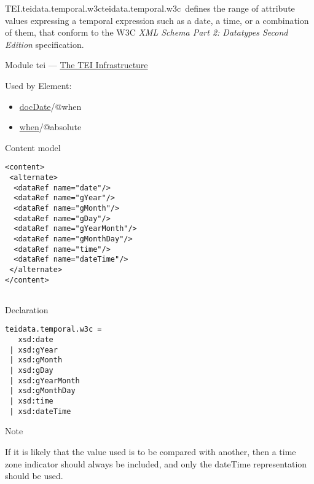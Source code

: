 \begin{reflist}
\item[]\begin{specHead}{TEI.teidata.temporal.w3c}{teidata.temporal.w3c} defines the range of attribute values expressing a temporal expression such as a date, a time, or a combination of them, that conform to the W3C \textit{XML Schema Part 2: Datatypes Second Edition} specification.\end{specHead} 
    \item[{Module}]
  tei — \hyperref[ST]{The TEI Infrastructure}
    \item[{Used by}]
  Element: \begin{itemize}
\item \hyperref[TEI.docDate]{docDate}/@when
\item \hyperref[TEI.when]{when}/@absolute
\end{itemize} 
    \item[{Content model}]
  \mbox{}\hfill\\[-10pt]\begin{Verbatim}[fontsize=\small]
<content>
 <alternate>
  <dataRef name="date"/>
  <dataRef name="gYear"/>
  <dataRef name="gMonth"/>
  <dataRef name="gDay"/>
  <dataRef name="gYearMonth"/>
  <dataRef name="gMonthDay"/>
  <dataRef name="time"/>
  <dataRef name="dateTime"/>
 </alternate>
</content>
    
\end{Verbatim}

    \item[{Declaration}]
  \mbox{}\hfill\\[-10pt]\begin{Verbatim}[fontsize=\small]
teidata.temporal.w3c =
   xsd:date
 | xsd:gYear
 | xsd:gMonth
 | xsd:gDay
 | xsd:gYearMonth
 | xsd:gMonthDay
 | xsd:time
 | xsd:dateTime
\end{Verbatim}

    \item[{Note}]
  \par
If it is likely that the value used is to be compared with another, then a time zone indicator should always be included, and only the dateTime representation should be used.
\end{reflist}  

